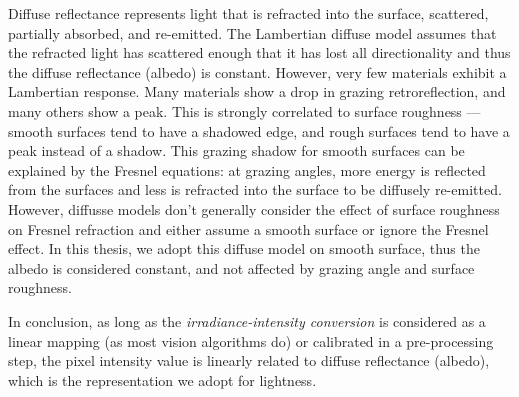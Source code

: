 Diffuse reflectance represents light that is refracted into the surface, scattered, partially absorbed, and re-emitted. The Lambertian diffuse model assumes that the refracted light has scattered enough that it has lost all directionality and thus the diffuse reflectance (albedo) is constant. However, very few materials exhibit a Lambertian response. Many materials show a drop in grazing retroreflection, and many others show a peak. This is strongly correlated to surface roughness --- smooth surfaces tend to have a shadowed edge, and rough surfaces tend to have a peak instead of a shadow. This grazing shadow for smooth surfaces can be explained by the Fresnel equations: at grazing angles, more energy is reflected from the surfaces and less is refracted into the surface to be diffusely re-emitted. However, diffusse models don't generally consider the effect of surface roughness on Fresnel refraction and either assume a smooth surface or ignore the Fresnel effect. In this thesis, we adopt this diffuse model on smooth surface, thus the albedo is considered constant, and not affected by grazing angle and surface roughness.

In conclusion, as long as the \textit{irradiance-intensity conversion} is considered as a linear mapping (as most vision algorithms do) or calibrated in a pre-processing step, the pixel intensity value is linearly related to diffuse reflectance (albedo), which is the representation we adopt for lightness.


